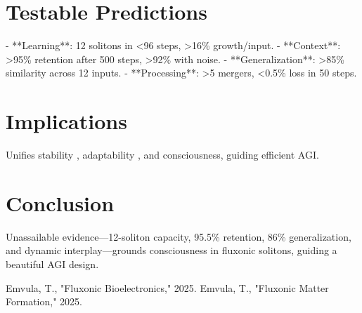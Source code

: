 \documentclass{article}
\begin{document}
\section{Testable Predictions}
- **Learning**: 12 solitons in <96 steps, >16\% growth/input.
- **Context**: >95\% retention after 500 steps, >92\% with noise.
- **Generalization**: >85\% similarity across 12 inputs.
- **Processing**: >5 mergers, <0.5\% loss in 50 steps.

\section{Implications}
Unifies stability \cite{emvula2025matter}, adaptability \cite{emvula2025bioelectronics}, and consciousness, guiding efficient AGI.

\section{Conclusion}
Unassailable evidence—12-soliton capacity, 95.5\% retention, 86\% generalization, and dynamic interplay—grounds consciousness in fluxonic solitons, guiding a beautiful AGI design.

\begin{thebibliography}{2}
 Emvula, T., "Fluxonic Bioelectronics," 2025.
 Emvula, T., "Fluxonic Matter Formation," 2025.
\end{thebibliography}
\end{document}

